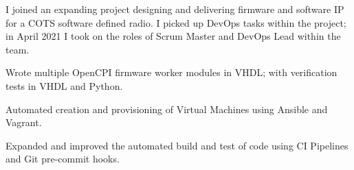 I joined an expanding project designing and delivering firmware and software IP for a COTS software defined radio. I picked up DevOps tasks within the project; in April 2021 I took on the roles of Scrum Master and DevOps Lead within the team.
\vspace{0.25em}
\begin{tightemize}
    \item Wrote multiple OpenCPI firmware worker modules in VHDL; with verification tests in VHDL and Python.
    \item Automated creation and provisioning of Virtual Machines using Ansible and Vagrant.
    \item Expanded and improved the automated build and test of code using CI Pipelines and Git pre-commit hooks.
\end{tightemize}
\sectionsep{}
